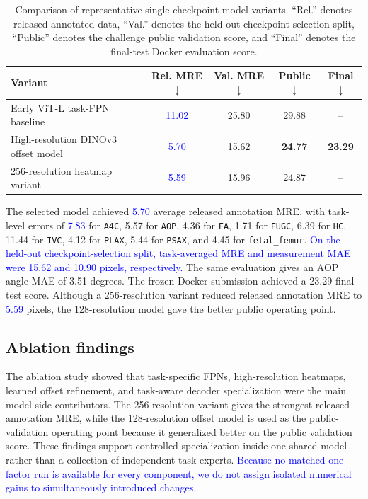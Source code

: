\documentclass[runningheads]{llncs}
\newcommand{\revisiontext}[1]{\textcolor{blue}{#1}}
\begin{document}
\begin{table}[t]
  \centering
  \caption{Comparison of representative single-checkpoint model variants. ``Rel.'' denotes released annotated data, ``Val.'' denotes the held-out checkpoint-selection split, ``Public'' denotes the challenge public validation score, and ``Final'' denotes the final-test Docker evaluation score.}
  \label{tab:main-results}
  \small
  \setlength{\tabcolsep}{3pt}
  \begin{tabular}{lcccc}
    \toprule
    Variant & Rel. MRE$\downarrow$ & Val. MRE$\downarrow$ & Public$\downarrow$ & Final$\downarrow$ \\
    \midrule
    Early ViT-L task-FPN baseline & \revisiontext{11.02} & 25.80 & 29.88 & -- \\
    High-resolution DINOv3 offset model & \revisiontext{5.70} & 15.62 & \textbf{24.77} & \textbf{23.29} \\
    256-resolution heatmap variant & \revisiontext{5.59} & 15.96 & 24.87 & -- \\
    \bottomrule
  \end{tabular}
\end{table}

The selected model achieved \revisiontext{5.70} average released annotation MRE, with task-level errors of \revisiontext{7.83} for \texttt{A4C}, 5.57 for \texttt{AOP}, 4.36 for \texttt{FA}, 1.71 for \texttt{FUGC}, 6.39 for \texttt{HC}, 11.44 for \texttt{IVC}, 4.12 for \texttt{PLAX}, 5.44 for \texttt{PSAX}, and 4.45 for \texttt{fetal\_femur}. \revisiontext{On the held-out checkpoint-selection split, task-averaged MRE and measurement MAE were 15.62 and 10.90 pixels, respectively.} The same evaluation gives an AOP angle MAE of 3.51 degrees. The frozen Docker submission achieved a 23.29 final-test score. Although a 256-resolution variant reduced released annotation MRE to \revisiontext{5.59} pixels, the 128-resolution model gave the better public operating point.

\subsection{Ablation findings}
The ablation study showed that task-specific FPNs, high-resolution heatmaps, learned offset refinement, and task-aware decoder specialization were the main model-side contributors. The 256-resolution variant gives the strongest released annotation MRE, while the 128-resolution offset model is used as the public-validation operating point because it generalized better on the public validation score. These findings support controlled specialization inside one shared model rather than a collection of independent task experts. \revisiontext{Because no matched one-factor run is available for every component, we do not assign isolated numerical gains to simultaneously introduced changes.}
\end{document}
